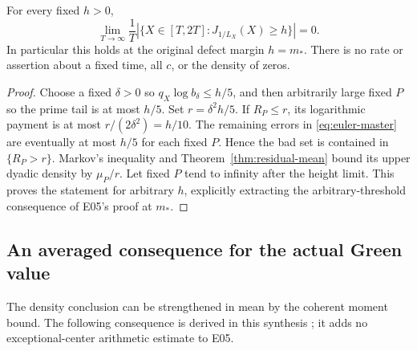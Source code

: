 \begin{corollary}
\label{cor:green-density}
For every fixed \(h>0\),
\begin{equation}\label{eq:green-density}
 \lim_{T\to\infty}\frac1T
   |\{X\in[T,2T]:J_{1/L_X}(X)\ge h\}|=0.
\end{equation}
In particular this holds at the original defect margin \(h=m_*\).
There is no rate or assertion about a fixed time, all \(c\), or
the density of zeros.
\end{corollary}
\begin{proof}
Choose a fixed \(\delta>0\) so \(q_X\log b_\delta\le h/5\),
and then arbitrarily large fixed \(P\) so the prime tail is at most
\(h/5\). Set \(r=\delta^2h/5\). If \(R_P\le r\), its
logarithmic payment is at most \(r/(2\delta^2)=h/10\).
The remaining errors in \eqref{eq:euler-master} are eventually at
most \(h/5\) for each fixed \(P\). Hence the bad set is contained
in \(\{R_P>r\}\). Markov's inequality and
Theorem~\ref{thm:residual-mean} bound its upper dyadic density by
\(\mu_P/r\). Let fixed \(P\) tend to infinity after the height
limit. This proves the statement for arbitrary \(h\), explicitly
extracting the arbitrary-threshold consequence of E05's proof at
\(m_*\).
\end{proof}

\subsection{An averaged consequence for the actual Green value}
The density conclusion can be strengthened in mean by the coherent
moment bound. The following consequence is derived in this synthesis
\cite{GNPRSMeanConsequences}; it adds no exceptional-center arithmetic
estimate to E05.

